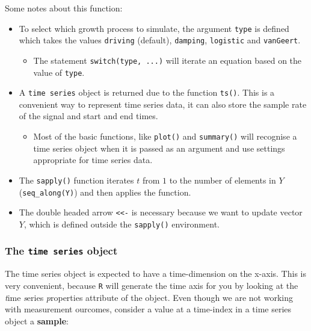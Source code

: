 \documentclass[]{book}
\providecommand{\tightlist}{%
  \setlength{\itemsep}{0pt}\setlength{\parskip}{0pt}}
\begin{document}
Some notes about this function:

\begin{itemize}
\tightlist
\item
  To select which growth process to simulate, the argument \texttt{type}
  is defined which takes the values \texttt{driving} (default),
  \texttt{damping}, \texttt{logistic} and \texttt{vanGeert}.

  \begin{itemize}
  \tightlist
  \item
    The statement \texttt{switch(type,\ ...)} will iterate an equation
    based on the value of \texttt{type}.
  \end{itemize}
\item
  A \texttt{time\ series} object is returned due to the function
  \texttt{ts()}. This is a convenient way to represent time series data,
  it can also store the sample rate of the signal and start and end
  times.

  \begin{itemize}
  \tightlist
  \item
    Most of the basic functions, like \texttt{plot()} and
    \texttt{summary()} will recognise a time series object when it is
    passed as an argument and use settings appropriate for time series
    data.
  \end{itemize}
\item
  The \texttt{sapply()} function iterates \(t\) from \(1\) to the number
  of elements in \(Y\) (\texttt{seq\_along(Y)}) and then applies the
  function.
\item
  The double headed arrow \texttt{\textless{}\textless{}-} is necessary
  because we want to update vector \(Y\), which is defined outside the
  \texttt{sapply()} environment.
\end{itemize}

\subsubsection*{\texorpdfstring{The \texttt{time\ series}
object}{The time series object}}\label{the-time-series-object}

The time series object is expected to have a time-dimension on the
x-axis. This is very convenient, because \texttt{R} will generate the
time axis for you by looking at the \emph{t}ime \emph{s}eries
\emph{p}roperties attribute of the object. Even though we are not
working with measurement ourcomes, consider a value at a time-index in a
time series object a \textbf{sample}:
\end{document}

